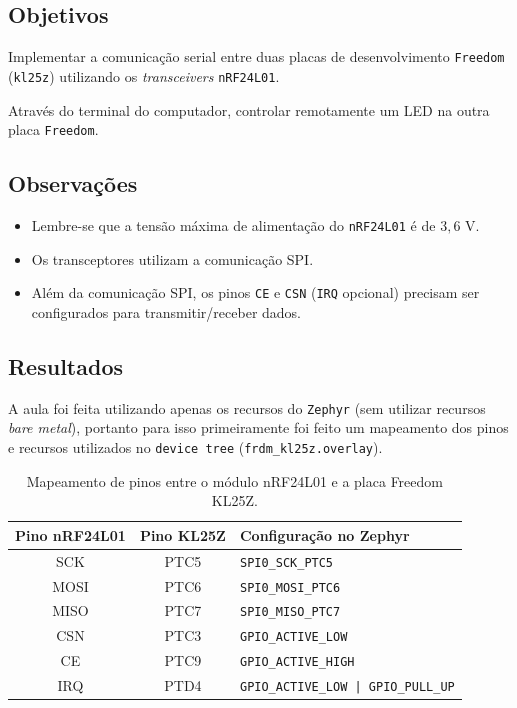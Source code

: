     \subsection{Objetivos}
        Implementar a comunicação serial entre duas placas de desenvolvimento \texttt{Freedom} (\texttt{kl25z}) utilizando os \textit{transceivers} \texttt{nRF24L01}.
    
    Através do terminal do computador, controlar remotamente um LED na outra placa \texttt{Freedom}.

\subsection{Observações}
    \begin{itemize}
        \item Lembre-se que a tensão máxima de alimentação do \texttt{nRF24L01} é de \(3{,}6\) V.
        \item Os transceptores utilizam a comunicação SPI.
        \item Além da comunicação SPI, os pinos \texttt{CE} e \texttt{CSN} (\texttt{IRQ} opcional) precisam ser configurados para transmitir/receber dados.
    \end{itemize}

\subsection{Resultados}
    A aula foi feita utilizando apenas os recursos do \texttt{Zephyr} (sem utilizar recursos \textit{bare metal}), portanto para isso primeiramente foi feito um mapeamento dos pinos e recursos utilizados no \texttt{device tree} (\texttt{frdm\_kl25z.overlay}). 

    \begin{table}[H]
    \centering
    \begin{tabular}{ c c l }
        \hline
        \textbf{Pino nRF24L01} & \textbf{Pino KL25Z} & \textbf{Configuração no Zephyr}             \\ \hline
        SCK                    & PTC5                & \texttt{SPI0\_SCK\_PTC5}                    \\
        MOSI                   & PTC6                & \texttt{SPI0\_MOSI\_PTC6}                   \\ 
        MISO                   & PTC7                & \texttt{SPI0\_MISO\_PTC7}                   \\ 
        CSN                    & PTC3                & \texttt{GPIO\_ACTIVE\_LOW}                  \\ 
        CE                     & PTC9                & \texttt{GPIO\_ACTIVE\_HIGH}                 \\ 
        IRQ                    & PTD4                & \texttt{GPIO\_ACTIVE\_LOW | GPIO\_PULL\_UP} \\ \hline
    \end{tabular}
    \caption{Mapeamento de pinos entre o módulo nRF24L01 e a placa Freedom KL25Z.}
    \end{table}

